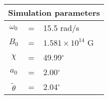 \begin{tabular}{ccl}
\multicolumn{3}{c}{Simulation parameters} \\
\hline
$\omega_0$  &=& 15.5 rad/s\\
$B_0$  &=& $ 1.581\times 10^{14} $ G \\
$\chi$  &=& 49.99$^{\circ}$ \\
$a_0$ &=& 2.00$^{\circ}$ \\
$\tilde{\theta}$ &= & 2.04$^{\circ}$
\end{tabular}
    